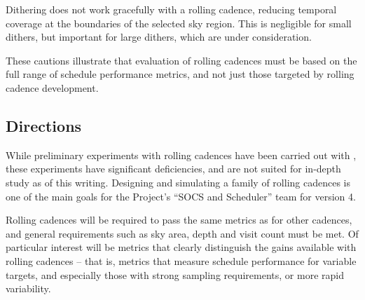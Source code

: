 Dithering does not work gracefully with a rolling cadence, reducing
temporal coverage at the boundaries of the selected sky region.  This is
negligible for small dithers, but important for large dithers, which are
under consideration.

These cautions illustrate that evaluation of rolling cadences must be
based on the full range of schedule performance metrics, and not just
those targeted by rolling cadence development.



\subsection{Directions}
\label{sec:rolling:directions}

While preliminary experiments with rolling cadences have been carried
out with \OpSim, these experiments have significant deficiencies, and
are not suited for in-depth study as of this writing. Designing and
simulating a family of rolling cadences is one of the main goals for the
Project's ``SOCS and Scheduler'' team for \OpSim version 4.

Rolling cadences will be required to pass the same metrics as for other
cadences, and general requirements such as sky area, depth and visit
count must be met.  Of particular interest will be metrics that clearly
distinguish the gains available with rolling cadences -- that is,
metrics that measure schedule performance for variable targets, and
especially those with strong sampling requirements, or more rapid
variability.


